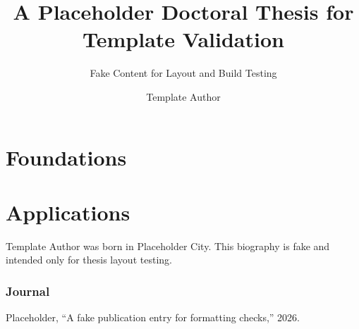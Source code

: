 \documentclass{phdthesis}
\title{A Placeholder Doctoral Thesis for Template Validation}
\subtitle{Fake Content for Layout and Build Testing}
\author{Template Author}
\begin{document}
\providecommand{\hypersetup}[1]{}
\hypersetup{pageanchor=false}

\frontmatter
\maketitle


\tableofcontents
\cleardoublepage
\listoftables
\cleardoublepage


\cleardoublepage
\hypersetup{pageanchor=true}

\mainmatter

\part{Foundations}




\part{Applications}











\begin{vita}
Template Author was born in Placeholder City. This biography is fake and intended only for thesis layout testing.
\end{vita}

\begin{achievements}
\section*{Journal}
\begin{achievementlist}
\item Placeholder, ``A fake publication entry for formatting checks,'' 2026.
\end{achievementlist}
\end{achievements}
\end{document}
